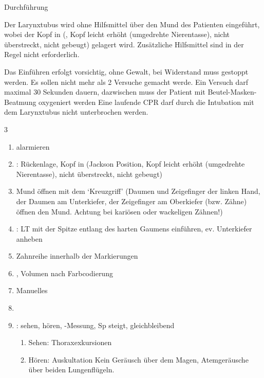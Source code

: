 {Durchführung}
{Der
Larynxtubus wird ohne Hilfsmittel
über den Mund des Patienten eingeführt, wobei der Kopf
in  (, Kopf
  leicht erhöht (umgedrehte Nierentasse), nicht überstreckt,
  nicht gebeugt) gelagert wird. Zusätzliche Hilfsmittel
 sind in der Regel nicht erforderlich.

Das Einführen erfolgt vorsichtig, ohne Gewalt, bei
Widerstand muss gestoppt werden. Es sollen nicht mehr als 2
Versuche gemacht werde. Ein
Versuch darf maximal 30 Sekunden dauern, dazwischen muss der
Patient mit Beutel-Masken-Beatmung oxygeniert werden
Eine laufende CPR darf durch die Intubation mit dem
Larynxtubus nicht unterbrochen werden.

\begin{WidePar}
\begin{multicols}{3}
\begin{enumerate}\CorrectionListsBox
  \item {} alarmieren
  \item {}: Rückenlage, Kopf in
   (Jackson Position, Kopf
  leicht erhöht (umgedrehte Nierentasse), nicht überstreckt,
  nicht gebeugt)
  \item Mund öffnen mit dem
  \enquote*{Kreuzgriff} (Daumen und Zeigefinger der linken
  Hand, der Daumen am Unterkiefer, der Zeigefinger am
  Oberkiefer (bzw. Zähne) öffnen den Mund. Achtung bei
  kariösen oder wackeligen Zähnen!)
  \item {}: LT mit der Spitze
  entlang des harten Gaumens einführen, ev. Unterkiefer
  anheben
  \item Zahnreihe innerhalb der Markierungen
  \item
  , Volumen nach Farbcodierung
  \item Manuelles
  \item {}
  \item {}: sehen,
  hören, -Messung, Sp steigt, gleichbleibend
  \begin{enumerate}
    \item Sehen: Thoraxexkursionen
    \item Hören: Auskultation
    Kein Geräusch über dem
    Magen, Atemgeräusche über beiden Lungenflügeln.


\end{enumerate}
\end{enumerate}
\end{multicols}
\end{WidePar}}
